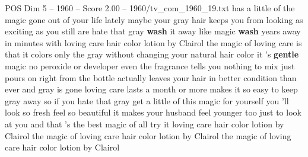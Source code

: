 \begin{textsample}{POS Dim 5 – 1960 – Score 2.00 – 1960/tv\_com\_1960\_19.txt}  \label{ex:f5_pos_085}
has a little of the magic gone out of your life lately maybe your gray hair keeps you from looking as exciting as you still are hate that gray \textbf{wash} it away like magic \textbf{wash} years away in minutes with loving care hair color lotion by Clairol the magic of loving care is that it colors only the gray without changing your natural hair color it 's \textbf{gentle} magic no peroxide or developer even the fragrance tells you nothing to mix just pours on right from the bottle actually leaves your hair in better condition than ever and gray is gone loving care lasts a month or more makes it so easy to keep gray away so if you hate that gray get a little of this magic for yourself you 'll look so fresh feel so beautiful it makes your husband feel younger too just to look at you and that 's the best magic of all try it loving care hair color lotion by Clairol the magic of loving care hair color lotion by Clairol the magic of loving care hair color lotion by Clairol

\end{textsample}
